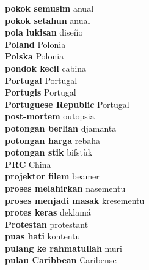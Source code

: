 \textbf{ pokok semusim  } anual \\
\textbf{ pokok setahun  } anual \\
\textbf{ pola lukisan  } diseño \\
\textbf{ Poland  } Polonia \\
\textbf{ Polska  } Polonia \\
\textbf{ pondok kecil  } cabina \\
\textbf{ Portugal  } Portugal \\
\textbf{ Portugis  } Portugal \\
\textbf{ Portuguese Republic  } Portugal \\
\textbf{ post-mortem  } outopsia \\
\textbf{ potongan berlian  } djamanta \\
\textbf{ potongan harga  } rebaha \\
\textbf{ potongan stik  } bifstùk \\
\textbf{ PRC  } China \\
\textbf{ projektor filem  } beamer \\
\textbf{ proses melahirkan  } nasementu \\
\textbf{ proses menjadi masak  } kresementu \\
\textbf{ protes keras  } deklamá \\
\textbf{ Protestan  } protestant \\
\textbf{ puas hati  } kontentu \\
\textbf{ pulang ke rahmatullah  } muri \\
\textbf{ pulau Caribbean  } Caribense \\

